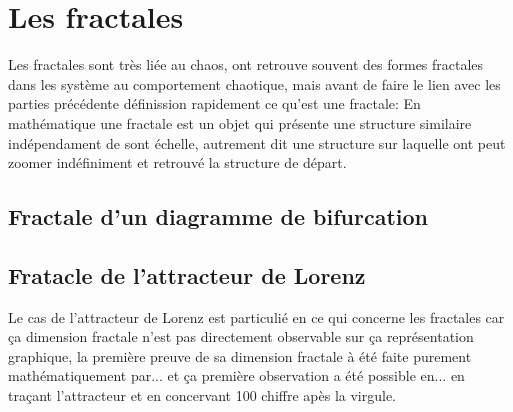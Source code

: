 \chapter{Les fractales}
Les fractales sont très liée au chaos, ont retrouve souvent des formes fractales dans les système au comportement chaotique, mais avant de faire le lien avec les parties précédente définission rapidement ce qu'est une fractale: En mathématique une fractale est un objet qui présente une structure similaire indépendament de sont échelle, autrement dit une structure sur laquelle ont peut zoomer indéfiniment et retrouvé la structure de départ.
\section{Fractale d'un diagramme de bifurcation}

\section{Fratacle de l'attracteur de Lorenz}
Le cas de l'attracteur de Lorenz est particulié en ce qui concerne les fractales car ça dimension fractale n'est pas directement observable sur ça représentation graphique, la première preuve de sa dimension fractale à été faite purement mathématiquement par... et ça première observation a été possible en... en traçant l'attracteur et en concervant 100 chiffre apès la virgule.